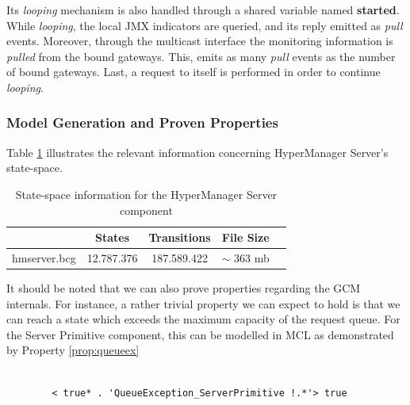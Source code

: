 	\noindent Its \textit{looping} mechanism is also handled through a shared 
	variable named \textbf{started}.  While \textit{looping}, 
	the local \ac{JMX} indicators are queried, and its reply emitted 
	as \textit{pull} events. Moreover, through the multicast interface 
	the monitoring information is \textit{pulled} from the bound gateways. 
	This, emits as many \textit{pull}
    events as the number of bound gateways. Last, a request to 
    itself is performed in order to continue \textit{looping}.


\subsubsection{Model Generation and Proven Properties}


	Table \ref{tab:modelS} illustrates the relevant information concerning \textsf{HyperManager Server}'s 
	state-space.

\begin{table}[H]
\begin{center}
\begin{tabular}{| l | c | c | c | c |}
\hline
                             &  \textbf{States} & \textbf{Transitions} & \textbf{File Size} \\
\hline
  \textsf{hmserver.bcg}                                   &   12.787.376   &  187.589.422  &  $\sim$  363 mb\\
  \hline
\end{tabular}
\end{center}
\caption{State-space information for the \textsf{HyperManager Server} component}
\label{tab:modelS}
\end{table}

		
	It should be noted that we can also prove properties regarding the \ac{GCM} internals.
	For instance, a rather trivial property we can expect to hold is that we can reach a state 
	which exceeds the maximum capacity of the request queue. 
	For the \textsf{Server Primitive} component, this can be modelled in \textsf{MCL} as demonstrated
	by Property \ref{prop:queueex}
  	
	\begin{property}
	\label{prop:queueex}
	\begin{verbatim}
	
		< true* . 'QueueException_ServerPrimitive !.*'> true
	\end{verbatim}
	\end{property}

